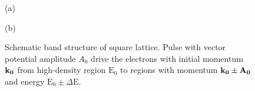 \begin{figure}[h!]
\begin{minipage}[h]{0.5\linewidth}
 (a) \\
\end{minipage}
\hfill
\begin{minipage}[h]{0.5\linewidth}
 (b) \\
\end{minipage}
\caption{Schematic band structure of square lattice. Pulse with vector potential amplitude $A_0$ drive the electrons with initial momentum $\bf k_0$ from high-density region $\text{E}_0$ to regions with momentum $\bf k_{0} \pm A_0$ and energy $\text{E}_{0}\pm\Delta\text{E}$.}
\label{BandPulse}
\end{figure}

